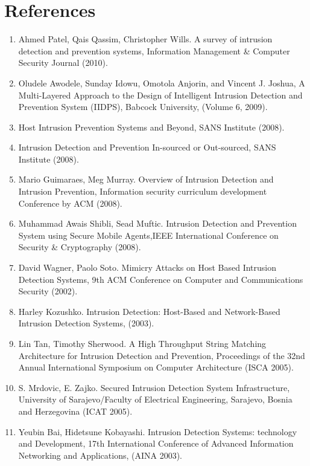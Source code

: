 \documentclass[12pt,a4paper]{report}
\begin{document}
\chapter{References}
\newpage
\begin{enumerate}
\item	Ahmed Patel, Qais Qassim, Christopher Wills. A survey of intrusion detection and prevention systems, Information Management \& Computer Security Journal (2010).
\item Oludele Awodele, Sunday Idowu, Omotola Anjorin, and Vincent J. Joshua, A Multi-Layered Approach to the Design of Intelligent Intrusion Detection and Prevention System (IIDPS), Babcock University, (Volume 6, 2009).
\item	Host Intrusion Prevention Systems and Beyond, SANS Institute (2008).
\item	Intrusion Detection and Prevention In-sourced or Out-sourced, SANS Institute (2008).
\item	Mario Guimaraes, Meg Murray. Overview of Intrusion Detection and Intrusion Prevention, Information security curriculum development Conference by ACM (2008).
\item	Muhammad Awais Shibli, Sead Muftic. Intrusion Detection and Prevention System using Secure Mobile Agents,IEEE International Conference on Security \& Cryptography (2008).
\item	David Wagner, Paolo Soto. Mimicry Attacks on Host Based Intrusion Detection Systems, 9th ACM Conference on Computer and Communications Security (2002).
\item	Harley Kozushko. Intrusion Detection: Host-Based and Network-Based Intrusion Detection Systems, (2003).
\item	Lin Tan, Timothy Sherwood. A High Throughput String Matching Architecture for Intrusion Detection and Prevention, Proceedings of the 32nd Annual International Symposium on Computer Architecture (ISCA 2005).
\item	S. Mrdovic, E. Zajko. Secured Intrusion Detection System Infrastructure, University of Sarajevo/Faculty of Electrical Engineering, Sarajevo, Bosnia and Herzegovina (ICAT 2005).
\item	Yeubin Bai, Hidetsune Kobayashi. Intrusion Detection Systems: technology and Development, 17th International Conference of Advanced Information Networking and Applications, (AINA 2003).

\end{enumerate}
\end{document}
